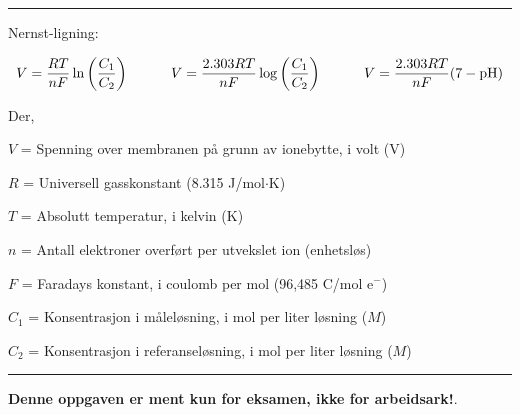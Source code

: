 \vskip 5pt
\hrule
\vskip 5pt

\noindent
Nernst-ligning:

$$V = {{R T} \over {nF}} \ln \left({C_1 \over C_2}\right) \hskip 30pt V = {{2.303 R T} \over {nF}} \log \left({C_1 \over C_2}\right) \hskip 30pt V = {{2.303 R T} \over {nF}} (7 - \hbox{pH})$$

\noindent
Der,

$V$ = Spenning over membranen på grunn av ionebytte, i volt (V)

$R$ = Universell gasskonstant (8.315 J/mol$\cdot$K)

$T$ = Absolutt temperatur, i kelvin (K)

$n$ = Antall elektroner overført per utvekslet ion (enhetsløs)

$F$ = Faradays konstant, i coulomb per mol (96,485 C/mol e$^{-}$)

$C_1$ = Konsentrasjon i måleløsning, i mol per liter løsning ($M$)

$C_2$ = Konsentrasjon i referanseløsning, i mol per liter løsning ($M$)

\vskip 5pt
\hrule
\vskip 5pt















{\bf Denne oppgaven er ment kun for eksamen, ikke for arbeidsark!}.


